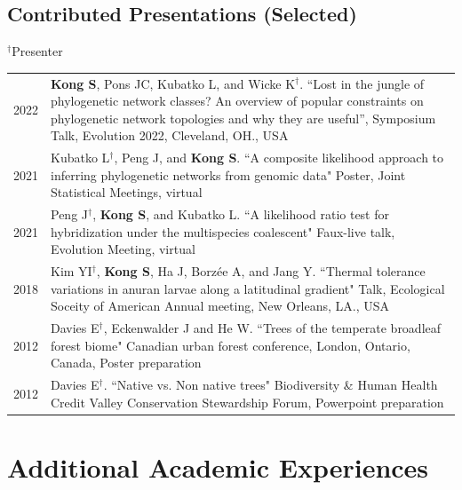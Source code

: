 \documentclass[11pt]{article}
\begin{document}
\subsection*{Contributed Presentations (Selected)}
$^\dag$Presenter
\begin{longtable}{p{}  p{}}
2022 & \textbf{Kong S}, Pons JC, Kubatko L, and Wicke K$^\dag$. ``Lost in the jungle of phylogenetic network classes? An overview of popular constraints on phylogenetic network topologies and why they are useful'', Symposium Talk, Evolution 2022, Cleveland, OH., USA \vspace{5pt}\\ 
2021 & Kubatko L$^\dag$, Peng J, and \textbf{Kong S}. ``A composite likelihood approach to inferring phylogenetic networks from genomic data" Poster, Joint Statistical Meetings, virtual \vspace{5pt} \\ 
2021 & Peng J$^\dag$, \textbf{Kong S}, and Kubatko L. ``A likelihood ratio test for hybridization under the multispecies coalescent" Faux-live talk, Evolution Meeting, virtual \vspace{5pt} \\ 
2018 & Kim YI$^\dag$, \textbf{Kong S}, Ha J, Borzée A, and Jang Y. ``Thermal tolerance variations in anuran larvae along a latitudinal gradient" Talk, Ecological Soceity of American Annual meeting, New Orleans, LA., USA \vspace{5pt} \\ 
2012 & Davies E$^\dag$, Eckenwalder J and He W. ``Trees of the temperate broadleaf forest biome"
Canadian urban forest conference, London, Ontario, Canada, Poster preparation \vspace{5pt} \\ 
2012 & Davies E$^\dag$. ``Native vs. Non native trees" Biodiversity \& Human Health Credit Valley Conservation Stewardship Forum, Powerpoint preparation \vspace{5pt} \\ 
\end{longtable}

\hspace{0pt}





\section*{Additional Academic Experiences}
\end{document}
